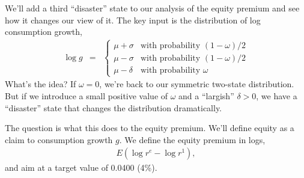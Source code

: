 \documentclass[11pt]{exam}
\begin{document}
\begin{questions}
\begin{solution}
\end{solution}

We'll add a third ``disaster'' state to our analysis of the equity premium
and see how it changes our view of it.
The key input is the distribution of log consumption growth,
\begin{eqnarray*}
    \log g &=& \left\{
                \begin{array}{ll}
                \mu + \sigma & \mbox{with probability } (1-\omega)/2 \\
                \mu - \sigma & \mbox{with probability } (1-\omega)/2 \\
                \mu - \delta & \mbox{with probability } \omega
                \end{array}
                \right.
\end{eqnarray*}
What's the idea?
If $\omega = 0$, we're back to our symmetric two-state distribution.
But if we introduce a small positive value of $\omega$ and a ``largish'' $\delta>0$,
we have a ``disaster'' state that changes the distribution dramatically.

The question is what this does to the equity premium.
We'll define equity as a claim to consumption growth $g$.
We define the equity premium in logs,
\begin{eqnarray*}
    E ( \log r^e - \log r^1 ) ,
\end{eqnarray*}
and aim at a target value of 0.0400 (4\%).


\end{questions}
\end{document}
